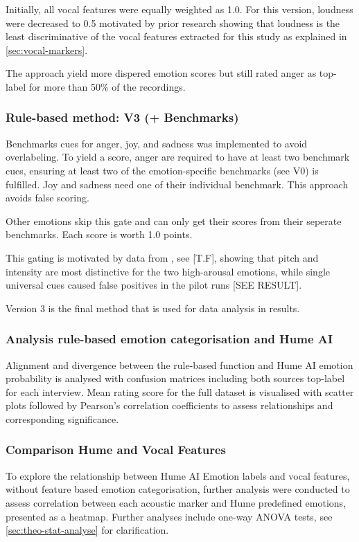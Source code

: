 Initially, all vocal features were equally weighted as 1.0. For this version, loudness were decreased to 0.5 motivated by prior research showing that loudness is the 
least discriminative of the vocal features extracted for this study as explained in \ref{sec:vocal-markers}. 

The approach yield more dispered emotion scores but still rated anger as top-label for more than 50\% of the recordings. 

\subsubsection{Rule-based method: V3 (+ Benchmarks)}
Benchmarks cues for anger, joy, and sadness was implemented to avoid overlabeling. To yield a score, anger are required to have at least two benchmark cues, ensuring at least two of the emotion-specific benchmarks (see V0) is fulfilled.  
Joy and sadness need one of their individual benchmark. This approach avoids false scoring. 

Other emotions skip this gate and can only get their scores from their seperate benchmarks. Each score is worth 1.0 points. 

This gating is motivated by data from \textcite{Ekberg2023}, see [T.F], showing that pitch and intensity are most distinctive for 
the two high-arousal emotions, while single universal cues caused false positives in the pilot runs [SEE RESULT]. 

Version 3 is the final method that is used for data analysis in results. 

\subsubsection{Analysis rule-based emotion categorisation and Hume AI}
Alignment and divergence between the rule-based function and Hume AI emotion probability is analysed with confusion matrices including both sources top-label for each interview. 
Mean rating score for the full dataset is visualised with scatter plots followed by Pearson's correlation coefficients to assess relationships and corresponding significance. 

\subsubsection{Comparison Hume and Vocal Features}
To explore the relationship between Hume AI Emotion labels and vocal features, without feature based emotion categorisation, further analysis were conducted to assess correlation between each acoustic marker and Hume predefined emotions, presented as a heatmap.
Further analyses include one-way ANOVA tests, see \ref{sec:theo-stat-analyse} for clarification. 

